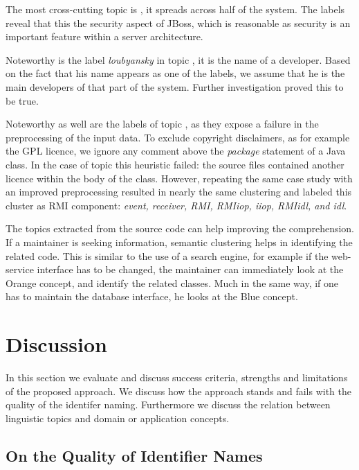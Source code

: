 \documentclass[10pt]{book}
\begin{document}
The most cross-cutting topic is \yellow, it spreads across half of the system. The labels reveal that this the security aspect of JBoss, which is reasonable as security is an important feature within a server architecture.

Noteworthy is the label \emph{loubyansky} in topic \blue, it is the name of a developer. Based on the fact that his name appears as one of the labels, we assume that he is the main developers of that part of the system. Further investigation proved this to be true.

Noteworthy as well are the labels of topic \darkgreen, as they expose a failure in the preprocessing of the input data. To exclude copyright disclaimers, as for example the GPL licence, we ignore any comment above the \emph{package} statement of a Java class. In the case of topic \darkgreen this heuristic failed: the source files contained another licence within the body of the class. However, repeating the same case study with an improved preprocessing resulted in nearly the same clustering and labeled this cluster as RMI component: \emph{event, receiver, RMI, RMIiop, iiop, RMIidl, and idl}.

The topics extracted from the source code can help improving the comprehension. If a maintainer is seeking information, semantic clustering helps in identifying the related code. This is similar to the use of a search engine, for example if the web-service interface has to be changed, the maintainer can immediately look at the Orange concept, and identify the related classes. Much in the same way, if one has to maintain the database interface, he looks at the Blue concept.


\section{Discussion}\label{sec:discussion}


In this section we evaluate and discuss success criteria, strengths and limitations of the proposed approach. We discuss how the approach stands and fails with the quality of the identifer naming. Furthermore we discuss the relation between linguistic topics and domain or application concepts.

\subsection{On the Quality of Identifier Names}
\end{document}
